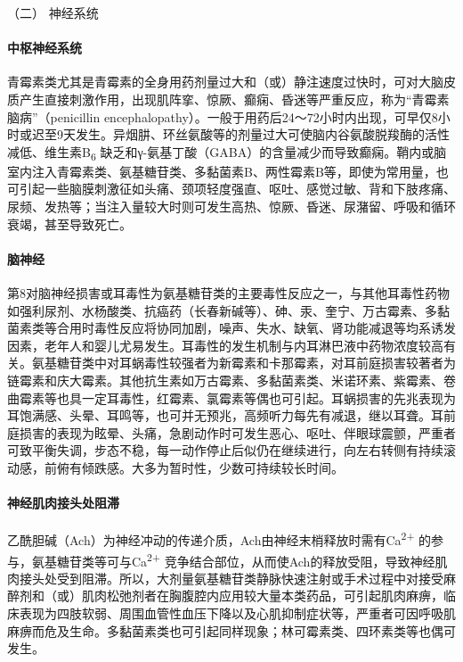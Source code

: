 \hypertarget{text00436.htmlux5cux23CHP17-7-7-1-2}{}
（二） 神经系统

\paragraph{中枢神经系统}

青霉素类尤其是青霉素的全身用药剂量过大和（或）静注速度过快时，可对大脑皮质产生直接刺激作用，出现肌阵挛、惊厥、癫痫、昏迷等严重反应，称为“青霉素脑病”（penicillin
encephalopathy）。一般于用药后24～72小时内出现，可早仅8小时或迟至9天发生。异烟肼、环丝氨酸等的剂量过大可使脑内谷氨酸脱羧酶的活性减低、维生素B\textsubscript{6}
缺乏和γ-氨基丁酸（GABA）的含量减少而导致癫痫。鞘内或脑室内注入青霉素类、氨基糖苷类、多黏菌素B、两性霉素B等，即使为常用量，也可引起一些脑膜刺激征如头痛、颈项轻度强直、呕吐、感觉过敏、背和下肢疼痛、尿频、发热等；当注入量较大时则可发生高热、惊厥、昏迷、尿潴留、呼吸和循环衰竭，甚至导致死亡。

\paragraph{脑神经}

第8对脑神经损害或耳毒性为氨基糖苷类的主要毒性反应之一，与其他耳毒性药物如强利尿剂、水杨酸类、抗癌药（长春新碱等）、砷、汞、奎宁、万古霉素、多黏菌素类等合用时毒性反应将协同加剧，噪声、失水、缺氧、肾功能减退等均系诱发因素，老年人和婴儿尤易发生。耳毒性的发生机制与内耳淋巴液中药物浓度较高有关。氨基糖苷类中对耳蜗毒性较强者为新霉素和卡那霉素，对耳前庭损害较著者为链霉素和庆大霉素。其他抗生素如万古霉素、多黏菌素类、米诺环素、紫霉素、卷曲霉素等也具一定耳毒性，红霉素、氯霉素等偶也可引起。耳蜗损害的先兆表现为耳饱满感、头晕、耳鸣等，也可并无预兆，高频听力每先有减退，继以耳聋。耳前庭损害的表现为眩晕、头痛，急剧动作时可发生恶心、呕吐、伴眼球震颤，严重者可致平衡失调，步态不稳，每一动作停止后似仍在继续进行，向左右转侧有持续滚动感，前俯有倾跌感。大多为暂时性，少数可持续较长时间。

\paragraph{神经肌肉接头处阻滞}

乙酰胆碱（Ach）为神经冲动的传递介质，Ach由神经末梢释放时需有Ca\textsuperscript{2+}
的参与，氨基糖苷类等可与Ca\textsuperscript{2+}
竞争结合部位，从而使Ach的释放受阻，导致神经肌肉接头处受到阻滞。所以，大剂量氨基糖苷类静脉快速注射或手术过程中对接受麻醉剂和（或）肌肉松弛剂者在胸腹腔内应用较大量本类药品，可引起肌肉麻痹，临床表现为四肢软弱、周围血管性血压下降以及心肌抑制症状等，严重者可因呼吸肌麻痹而危及生命。多黏菌素类也可引起同样现象；林可霉素类、四环素类等也偶可发生。


